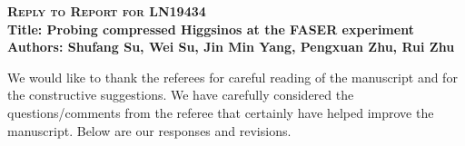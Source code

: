 \documentclass[12pt]{article}
\begin{document}
\begin{center}
\textsc{\bf \Large Reply to Report for LN19434}\\
\vspace{0.2in}
{\bf Title: Probing compressed Higgsinos at the FASER experiment}\\
\vspace{0.2in}
{\bf Authors:  Shufang Su, Wei Su, Jin Min Yang, Pengxuan Zhu, Rui Zhu
}
\end{center}

 
We would like to thank the referees for careful reading of the manuscript and for the constructive suggestions.   We have carefully considered the questions/comments from the referee that certainly have helped improve the manuscript. Below are our responses and revisions. \\



\noindent
\end{document}
